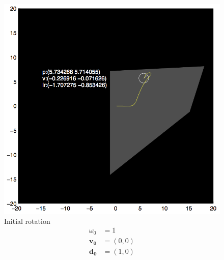 \documentclass{report}
\begin{document}
\begin{figure}
\begin{minipage}[t]{0.45\linewidth}
    \includegraphics[width=\linewidth]{fig4.png}
    \captionsetup{singlelinecheck=off}
    \caption[.]{\label{fig:fig4}Initial rotation\begin{align*}
    \omega_0 &= 1 \\
    \mathbf{v_0} &= (0, 0)\\
    \mathbf{d_0} &= (1, 0)
    \end{align*}
    }
\end{minipage}
\end{figure}



\end{document}
